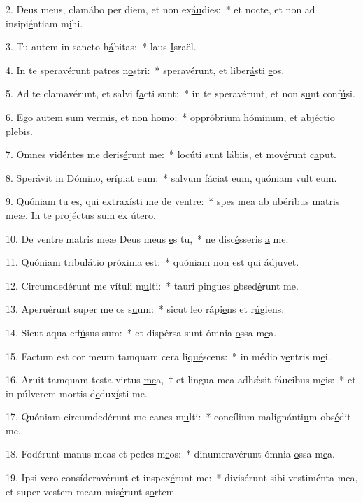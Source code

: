 2. Deus meus, clamábo per diem, et non ex\uline{áu}dies:~* et nocte, et non ad insipi\uline{é}ntiam m\uline{i}hi.\par 
3. Tu autem in sancto h\uline{á}bitas:~* laus \uline{I}sraël.\par 
4. In te speravérunt patres n\uline{o}stri:~* speravérunt, et liber\uline{á}sti \uline{e}os.\par 
5. Ad te clamavérunt, et salvi f\uline{a}cti sunt:~* in te speravérunt, et non s\uline{u}nt conf\uline{ú}si.\par 
6. Ego autem sum vermis, et non h\uline{o}mo:~* oppróbrium hóminum, et abj\uline{é}ctio pl\uline{e}bis.\par 
7. Omnes vidéntes me deris\uline{é}runt me:~* locúti sunt lábiis, et mov\uline{é}runt c\uline{a}put.\par 
8. Sperávit in Dómino, erípiat \uline{e}um:~* salvum fáciat eum, quóni\uline{a}m vult \uline{e}um.\par 
9. Quóniam tu es, qui extraxísti me de v\uline{e}ntre:~* spes mea ab ubéribus matris meæ. In te projéctus s\uline{u}m ex \uline{ú}tero.\par 
10. De ventre matris meæ Deus meus \uline{e}s tu,~* ne disc\uline{é}sseris \uline{a} me:\par 
11. Quóniam tribulátio próxim\uline{a} est:~* quóniam non \uline{e}st qui \uline{á}djuvet.\par 
12. Circumdedérunt me vítuli m\uline{u}lti:~* tauri pingues \uline{o}bsed\uline{é}runt me.\par 
13. Aperuérunt super me os s\uline{u}um:~* sicut leo rápi\uline{e}ns et r\uline{ú}giens.\par 
14. Sicut aqua eff\uline{ú}sus sum:~* et dispérsa sunt ómnia \uline{o}ssa m\uline{e}a.\par 
15. Factum est cor meum tamquam cera li\uline{qué}scens:~* in médio v\uline{e}ntris m\uline{e}i.\par 
16. Aruit tamquam testa virtus \uline{me}a,~† et lingua mea adhǽsit fáucibus m\uline{e}is:~* et in púlverem mortis d\uline{e}dux\uline{í}sti me.\par 
17. Quóniam circumdedérunt me canes m\uline{u}lti:~* concílium malignánti\uline{u}m obs\uline{é}dit me.\par 
18. Fodérunt manus meas et pedes m\uline{e}os:~* dinumeravérunt ómnia \uline{o}ssa m\uline{e}a.\par 
19. Ipsi vero consíderavérunt et inspex\uline{é}runt me:~* divisérunt sibi vestiménta mea, et super vestem meam mis\uline{é}runt s\uline{o}rtem.\par 
